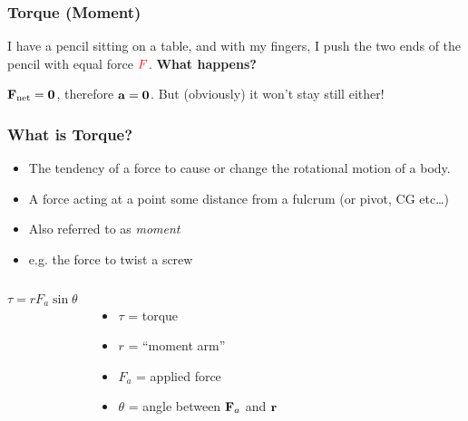 \documentclass[12pt,compress,aspectratio=169]{beamer}
\newcommand{\mb}[1]{\ensuremath\mathbf{#1}}
\begin{document}
\begin{frame}
  \frametitle{Torque (Moment)}
  I have a pencil sitting on a table, and with my fingers, I push the two ends
  of the pencil with equal force $\textcolor{red}{F}$. \textbf{What happens?}
  \begin{center}
  \end{center}
  $\mb{F}_\mathrm{net}=\mb{0}$, therefore $\mb{a}=\mb{0}$. But (obviously) it
  won't stay still either!
\end{frame}


\begin{frame}
  \frametitle{What is Torque?}
  \begin{itemize}
  \item The tendency of a force to cause or change the rotational motion of a
    body.
  \item A force acting at a point some distance from a fulcrum (or pivot, CG
    etc\ldots)
  \item Also referred to as \emph{moment}
  \item e.g. the force to twist a screw
  \end{itemize}
  
  \begin{columns}

    \vspace{-0.5in}
    {\Huge
      \begin{displaymath}
        \boxed{\tau=rF_a\sin\theta}
      \end{displaymath}
    }

    \vspace{-0.3in}
    \begin{itemize}
    \item $\tau$ = torque
    \item $r$ = ``moment arm''
    \item $F_a$ = applied force
    \item $\theta$ = angle between $\mb{F}_a$ and $\mb{r}$
    \end{itemize}
    \begin{center}
    \end{center}
  \end{columns}
\end{frame}
\end{document}
